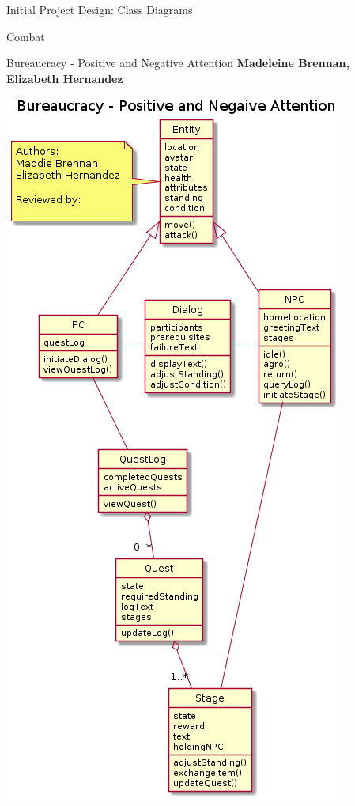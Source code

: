 \documentclass[12pt]{report}
\begin{document}
\begin{chapter}{Initial Project Design: Class Diagrams}
\begin{section}{Combat}
   \end{section}

   \begin{section}{Bureaucracy - Positive and Negative Attention}
    \textbf{Madeleine Brennan, Elizabeth Hernandez}

    \centerline{\includegraphics[width=\textwidth,height=\textheight,keepaspectratio]{./images/Class_Diagram.png}}


\end{section}
\end{chapter}
\end{document}
